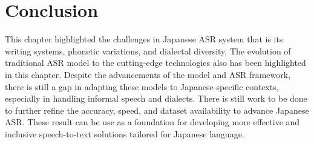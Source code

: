 \section{Conclusion}
This chapter highlighted the challenges in Japanese ASR system that is its writing systems, phonetic variations, and dialectal diversity. The evolution of traditional ASR model to the cutting-edge technologies also has been highlighted in this chapter. Despite the advancements of the model and ASR framework, there is still a gap in adapting these models to Japanese-specific contexts, especially in handling informal speech and dialects. There is still work to be done to further refine the accuracy, speed, and dataset availability to advance Japanese ASR. These result can be use as a foundation for developing more effective and inclusive speech-to-text solutions tailored for Japanese language.